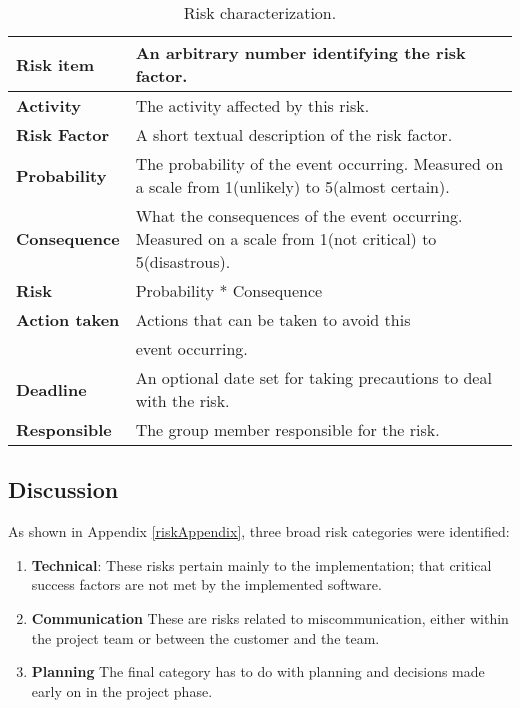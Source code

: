 \begin{table}[htdp]
\begin{center}
\begin{tabularx}{\textwidth}{| X | X |}
\hline
\textbf{Risk item} & An arbitrary number identifying the risk factor. \\
\hline
\textbf{Activity} & The activity affected by this risk. \\
\hline
\textbf{Risk Factor} & A short textual description of the risk factor. \\
\hline
\textbf{Probability} & The probability of the event occurring. Measured on a scale from 1(unlikely) to 5(almost certain).\\
\hline
\textbf{Consequence} & What the consequences of the event occurring. Measured on a scale from 1(not critical) to 5(disastrous).\\
\hline
\textbf{Risk} & Probability * Consequence\\
\hline
\textbf{Action taken} & Actions that can be taken to avoid this\\ & event occurring. \\
\hline
\textbf{Deadline} & An optional date set for taking precautions to deal with the risk. \\
\hline
\textbf{Responsible} & The group member responsible for the risk. \\
\hline
\end{tabularx}
\caption{Risk characterization.}
\end{center}
\label{riskTable}
\end{table}



\subsection{Discussion}

As shown in Appendix \ref{riskAppendix}, three broad risk categories were identified:

\begin{enumerate}
\item \textbf{Technical}: These risks pertain mainly to the  implementation; that critical success factors are not met by the implemented software.
\item \textbf{Communication} These are risks related to miscommunication, either within the project team or between the customer and the team.
\item \textbf{Planning} The final category has to do with planning and decisions made early on in the project phase.
\end{enumerate}

